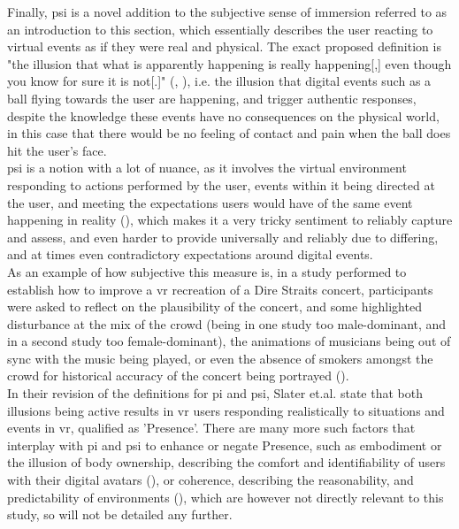 Finally, \gls{psi} is a novel addition to the subjective sense of immersion referred to as an introduction to this section, which essentially describes the user reacting to virtual events as if they were real and physical. The exact proposed definition is "the illusion that what is apparently happening is really happening[,] even though you know for sure it is not[.]" (\cite{slater-2009-place}, \cite{slater-2022-separate}), i.e. the illusion that digital events such as a ball flying towards the user are happening, and trigger authentic responses, despite the knowledge these events have no consequences on the physical world, in this case that there would be no feeling of contact and pain when the ball does hit the user's face.\\
\gls{psi} is a notion with a lot of nuance, as it involves the virtual environment responding to actions performed by the user, events within it being directed at the user, and meeting the expectations users would have of the same event happening in reality (\cite{slater-2022-separate}), which makes it a very tricky sentiment to reliably capture and assess, and even harder to provide universally and reliably due to differing, and at times even contradictory expectations around digital events.\\
As an example of how subjective this measure is, in a study performed to establish how to improve a \gls{vr} recreation of a Dire Straits concert, participants were asked to reflect on the plausibility of the concert, and some highlighted disturbance at the mix of the crowd (being in one study too male-dominant, and in a second study too female-dominant), the animations of musicians being out of sync with the music being played, or even the absence of smokers amongst the crowd for historical accuracy of the concert being portrayed (\cite{slater-2023-sentiment}).\\

In their revision of the definitions for \gls{pi} and \gls{psi}, Slater et.al. state that both illusions being active results in \gls{vr} users responding realistically to situations and events in \gls{vr}, qualified as 'Presence'. There are many more such factors that interplay with \gls{pi} and \gls{psi} to enhance or negate Presence, such as embodiment or the illusion of body ownership, describing the comfort and identifiability of users with their digital avatars (\cite{slater-2022-separate}), or coherence, describing the reasonability, and predictability of environments (\cite{skarbez-2018-immersion}), which are however not directly relevant to this study, so will not be detailed any further.

